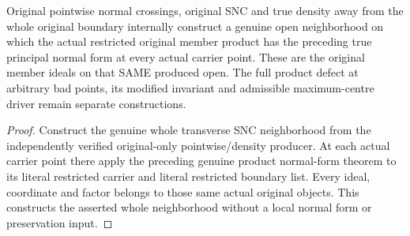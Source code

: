\begin{theorem}
\label{hir:sharp-original-member-product-original-neighborhood-producer}
\leanok
Original pointwise normal crossings, original SNC and true density away
from the whole original boundary internally construct a genuine open
neighborhood on which the actual restricted original member product
has the preceding true principal normal form at every actual carrier
point. These are the original member ideals on that SAME produced open.
The full product defect at arbitrary bad points, its modified invariant
and admissible maximum-centre driver remain separate constructions.
\end{theorem}
\begin{proof}
Construct the genuine whole transverse SNC neighborhood from the
independently verified original-only pointwise/density producer. At
each actual carrier point there apply the preceding genuine product
normal-form theorem to its literal restricted carrier and literal
restricted boundary list. Every ideal, coordinate and factor belongs
to those same actual original objects. This constructs the asserted
whole neighborhood without a local normal form or preservation input.
\end{proof}

